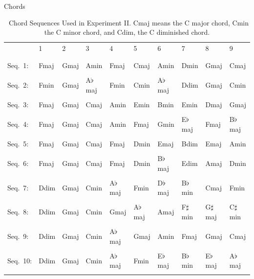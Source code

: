 \begin{table} [!h]
    \footnotesize
    \centering
    \small Chords\\ \vspace{1cm}
    \begin{tabular}{l|lllllllll}
        & 1 & 2 & 3 &4 & 5 & 6 & 7 & 8 & 9 \\ \\\hline\\
        Seq.~1: & Fmaj & Gmaj & Amin        & Fmaj & Cmaj & Amin  & Dmin   & Gmaj &
        Cmaj\\\\
        Seq.~2: & Fmin & Gmaj & A$\flat$maj & Fmin & Cmin & A$\flat$maj & Ddim & Gmaj & Cmin \\\\
        Seq.~3: & Fmaj & Gmaj & Cmaj & Amin & Emin & Bmin & Emin & Dmaj & Gmaj \\\\
        Seq.~4: & Fmaj & Gmaj & Cmaj & Amin & Fmaj & Gmin & E$\flat$maj & Fmaj & B$\flat$maj \\\\
        Seq.~5: & Fmaj & Gmaj & Cmaj & Fmaj & Dmin & Emaj & Bdim & Emaj & Amin \\\\
        Seq.~6: & Fmaj & Gmaj & Cmaj & Fmaj & Dmin & B$\flat$maj & Edim & Amaj & Dmin \\\\
        Seq.~7: & Ddim & Gmaj & Cmin & A$\flat$maj & Fmin & D$\flat$maj & B$\flat$min &
        Cmaj & Fmin \\\\
        Seq.~8: & Ddim & Gmaj & Cmin & Gmaj & A$\flat$maj & Amaj & F$\sharp$min &
        G$\sharp$maj & C$\sharp$min \\\\
        Seq.~9: & Ddim & Gmaj & Cmin & A$\flat$maj & Gmaj & Amin & Fmaj & Gmaj & Cmaj \\\\
        Seq.~10: & Ddim & Gmaj & Cmin & A$\flat$maj & Fmin & E$\flat$maj & B$\flat$min &
        E$\flat$maj & A$\flat$maj \\\\
    \end{tabular}
    \caption{\ Chord Sequences Used in Experiment II.
    Cmaj means the C major chord, Cmin the C minor chord, and Cdim,
    the C diminished chord.}
    \label{ChordSequences}
\end{table}

